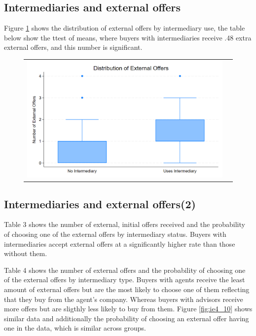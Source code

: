 \documentclass[12pt]{article}
\begin{document}



\newpage

\subsection{Intermediaries and external offers}


Figure \ref{fig:ie4_7} shows the distribution of external offers by intermediary use, the table below show the ttest of means, where buyers with intermediaries receive .48 extra external offers, and this number is significant.  
\begin{figure}[H]
\caption{}
 \label{fig:ie4_7}
\centering{}%
\begin{tabular}{cc}
\includegraphics[scale=0.17]{figures/IE4/IE4_intermediary_search_box.png} 
\end{tabular}
\end{figure}




\newpage

\subsection{Intermediaries and external offers(2)}

Table 3 shows the number of external, initial offers received and  the probability of choosing one of the external offers by intermediary status. Buyers with intermediaries accept external offers at a significantly higher rate than those without them. 

Table 4 shows the number of external offers and the probability of choosing one of the external offers by intermediary type. Buyers with agents receive the least amount of external offers but are the most likely to choose one of them reflecting that they buy from the agent's company. Whereas buyers with advisors receive more offers but are sligthly less likely to buy  from them. Figure \ref{fig:ie4_10} shows similar data and additionally the probability of choosing an external offer having one in the data, which is similar across groups. 
 
\end{document}
